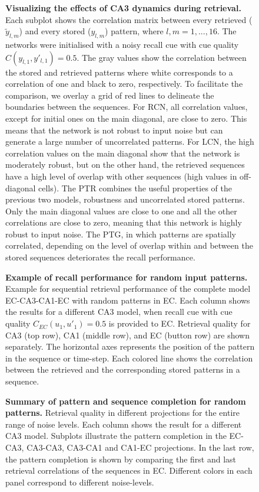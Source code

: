 \documentclass[utf8]{frontiersSCNS} %
\begin{document}
\begin{figure}[!htb]
\caption{\textbf{Visualizing the effects of CA3 dynamics during retrieval.} Each subplot shows the correlation matrix between every retrieved ($\tilde{y}_{l,m}$) and every stored ($y_{l,m}$) pattern, where $l, m = 1, ..., 16$. The networks were initialised with a noisy recall cue with cue quality $C(y_{l,1}, y'_{l,1}) = 0.5$. The gray values show the correlation between the stored and retrieved patterns where white corresponds to a correlation of one and black to zero, respectively. To facilitate the comparison, we overlay a grid of red lines to delineate the boundaries between the sequences. For RCN, all correlation values, except for initial ones on the main diagonal, are close to zero. This means that the network is not robust to input noise but can generate a large number of uncorrelated patterns. For LCN, the high correlation values on the main diagonal show that the network is moderately robust, but on the other hand, the retrieved sequences have a high level of overlap with other sequences (high values in off-diagonal cells). The PTR combines the useful properties of the previous two models, robustness and uncorrelated stored patterns. Only the main diagonal values are close to one and all the other correlations are close to zero, meaning that this network is highly robust to input noise. The PTG, in which patterns are spatially correlated, depending on the level of overlap within and between the stored sequences deteriorates the recall performance.}
\label{Fig_4}
\end{figure}

\begin{figure}[!htb]
\caption{\textbf{Example of recall performance for random input patterns.} Example for sequential retrieval performance of the complete model EC-CA3-CA1-EC with random patterns in EC. Each column shows the results for a different CA3 model, when recall cue with cue quality $C_{EC}(u_1, u'_1) = 0.5$ is provided to EC. Retrieval quality for CA3 (top row), CA1 (middle row), and EC (button row) are shown separately. The horizontal axes represents the position of the pattern in the sequence or time-step. Each colored line shows the correlation between the retrieved and the corresponding stored patterns in a sequence.} 
\label{Fig_5}
\end{figure}

\begin{figure}[!htb]
\caption{\textbf{Summary of pattern and sequence completion for random patterns.} Retrieval quality in different projections for the entire range of noise levels. Each column shows the result for a different CA3 model. Subplots illustrate the pattern completion in the EC-CA3, CA3-CA3, CA3-CA1 and CA1-EC projections. In the last row, the pattern completion is shown by comparing the first and last retrieval correlations of the sequences in EC. Different colors in each panel correspond to different noise-levels.}
\label{Fig_6}
\end{figure}
\end{document}
